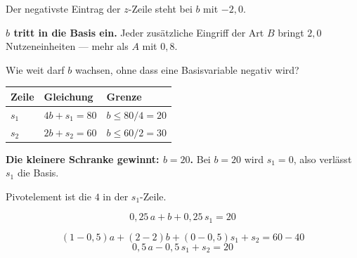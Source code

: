 \begin{merksatz}
Der negativste Eintrag der $z$-Zeile steht bei $b$ mit $-2{,}0$.

\begin{center}
\begin{minipage}{0.9\textwidth}
\textbf{$b$ tritt in die Basis ein.} Jeder zusätzliche Eingriff der Art $B$ bringt $2{,}0$ Nutzeneinheiten --- mehr als $A$ mit $0{,}8$.
\end{minipage}
\end{center}

Wie weit darf $b$ wachsen, ohne dass eine Basisvariable negativ wird?

\begin{center}
\renewcommand{\arraystretch}{1.5}
\begin{tabular}{@{}P{2.0cm}P{2.6cm}P{2.6cm}@{}}
\toprule
\textbf{Zeile} & \textbf{Gleichung} & \textbf{Grenze}\\
\midrule
$s_1$ & $4b + s_1 = 80$ & $b \le 80/4 = 20$\\
$s_2$ & $2b + s_2 = 60$ & $b \le 60/2 = 30$\\
\bottomrule
\end{tabular}
\end{center}

\begin{center}
\begin{minipage}{0.9\textwidth}
\textbf{Die kleinere Schranke gewinnt: $b = 20$.} Bei $b=20$ wird $s_1 = 0$, also verlässt $s_1$ die Basis.
\end{minipage}
\end{center}

\begin{center}
\begin{minipage}{0.88\textwidth}
\end{minipage}
\end{center}

Pivotelement ist die $4$ in der $s_1$-Zeile.

\[ 0{,}25\,a + b + 0{,}25\,s_1 = 20 \]

\[ (1-0{,}5)a + (2-2)b + (0-0{,}5)s_1 + s_2 = 60-40 \]
\[ 0{,}5\,a - 0{,}5\,s_1 + s_2 = 20 \]


\end{merksatz}
